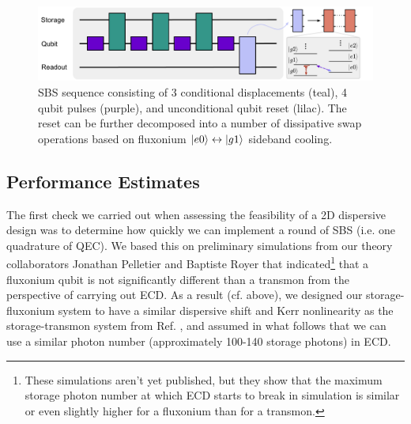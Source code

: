 \begin{figure}[h]
    \centering
 \includegraphics[width=\linewidth]{Figures/5/SBS_Sideband_Reset.pdf}
    \caption{SBS sequence consisting of 3 conditional displacements (teal), 4 qubit pulses (purple),  and unconditional qubit reset (lilac). The reset can be further decomposed into a number of dissipative swap operations based on fluxonium $\lvert e0\rangle\leftrightarrow\lvert g1\rangle$ sideband cooling.}
    \label{fig:5_SBS_Sideband_Reset}
\end{figure}

\clearpage
\subsection{Performance Estimates}

The first check we carried out when assessing the feasibility of a 2D dispersive design was to determine how quickly we can implement a round of SBS (i.e. one quadrature of QEC). We based this on preliminary simulations from our theory collaborators Jonathan Pelletier and Baptiste Royer that indicated\footnote{These simulations aren't yet published, but they show that the maximum storage photon number at which ECD starts to break in simulation is similar or even slightly higher for a fluxonium than for a transmon.} that a fluxonium qubit is not significantly different than a transmon from the perspective of carrying out ECD. As a result (cf. above), we designed our storage-fluxonium system to have a similar dispersive shift and Kerr nonlinearity as the storage-transmon system from Ref. \cite{sivak2023gkp-expt}, and assumed in what follows that we can use a similar photon number (approximately 100-140 storage photons) in ECD. 

